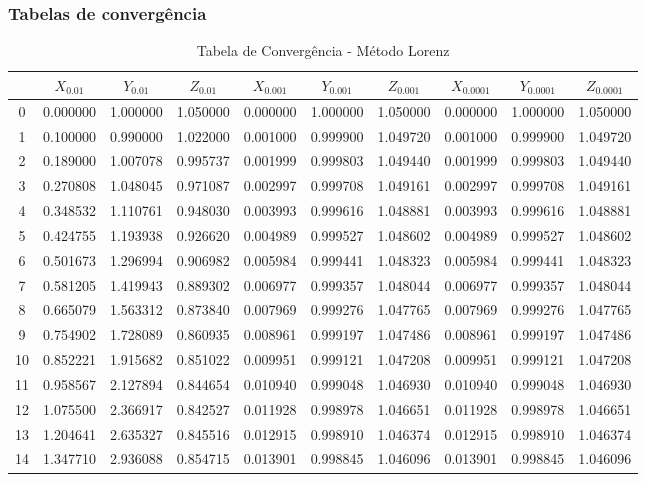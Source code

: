 \documentclass[12pt, a4paper]{article}
\begin{document}
    \subsubsection{Tabelas de convergência}
    \begin{table}[H]
        \centering
        \footnotesize %
        \begin{tabular}{|c|c|c|c|c|c|c|c|c|c|}
        \toprule
        & $X_{0.01}$ & $Y_{0.01}$ & $Z_{0.01}$ & $X_{0.001}$ & $Y_{0.001}$ & $Z_{0.001}$ & $X_{0.0001}$ & $Y_{0.0001}$ & $Z_{0.0001}$ \\
        \midrule
        0 & 0.000000 & 1.000000 & 1.050000 & 0.000000 & 1.000000 & 1.050000 & 0.000000 & 1.000000 & 1.050000 \\
        1 & 0.100000 & 0.990000 & 1.022000 & 0.001000 & 0.999900 & 1.049720 & 0.001000 & 0.999900 & 1.049720 \\
        2 & 0.189000 & 1.007078 & 0.995737 & 0.001999 & 0.999803 & 1.049440 & 0.001999 & 0.999803 & 1.049440 \\
        3 & 0.270808 & 1.048045 & 0.971087 & 0.002997 & 0.999708 & 1.049161 & 0.002997 & 0.999708 & 1.049161 \\
        4 & 0.348532 & 1.110761 & 0.948030 & 0.003993 & 0.999616 & 1.048881 & 0.003993 & 0.999616 & 1.048881 \\
        5 & 0.424755 & 1.193938 & 0.926620 & 0.004989 & 0.999527 & 1.048602 & 0.004989 & 0.999527 & 1.048602 \\
        6 & 0.501673 & 1.296994 & 0.906982 & 0.005984 & 0.999441 & 1.048323 & 0.005984 & 0.999441 & 1.048323 \\
        7 & 0.581205 & 1.419943 & 0.889302 & 0.006977 & 0.999357 & 1.048044 & 0.006977 & 0.999357 & 1.048044 \\
        8 & 0.665079 & 1.563312 & 0.873840 & 0.007969 & 0.999276 & 1.047765 & 0.007969 & 0.999276 & 1.047765 \\
        9 & 0.754902 & 1.728089 & 0.860935 & 0.008961 & 0.999197 & 1.047486 & 0.008961 & 0.999197 & 1.047486 \\
        10 & 0.852221 & 1.915682 & 0.851022 & 0.009951 & 0.999121 & 1.047208 & 0.009951 & 0.999121 & 1.047208 \\
        11 & 0.958567 & 2.127894 & 0.844654 & 0.010940 & 0.999048 & 1.046930 & 0.010940 & 0.999048 & 1.046930 \\
        12 & 1.075500 & 2.366917 & 0.842527 & 0.011928 & 0.998978 & 1.046651 & 0.011928 & 0.998978 & 1.046651 \\
        13 & 1.204641 & 2.635327 & 0.845516 & 0.012915 & 0.998910 & 1.046374 & 0.012915 & 0.998910 & 1.046374 \\
        14 & 1.347710 & 2.936088 & 0.854715 & 0.013901 & 0.998845 & 1.046096 & 0.013901 & 0.998845 & 1.046096 \\
        \bottomrule
        \end{tabular}
        \caption{Tabela de Convergência - Método Lorenz}
    \end{table}
    
\end{document}
